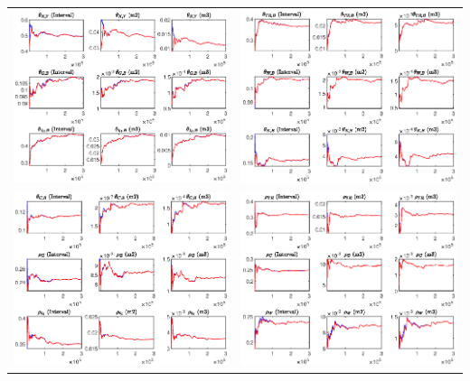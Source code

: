 \documentclass[a4paper,11pt]{article}
\numberwithin{equation}{section}
\begin{document}
\begin{minipage}{\linewidth}
{\begin{tabular}{p{9cm} p{9cm}}
			\includegraphics[width=9cm, trim =0 0 0.97cm 0]{SAFiscal_udiag15.eps} & \includegraphics[width=9cm, trim =0.97cm 0 0 0]{SAFiscal_udiag16.eps}\\
			\includegraphics[width=9cm, trim =0 0 0.97cm 0]{SAFiscal_udiag17.eps} & \includegraphics[width=9cm, trim =0.97cm 0 0 0]{SAFiscal_udiag18.eps}\\
		\end{tabular}
	}
\end{minipage}
\end{document}
